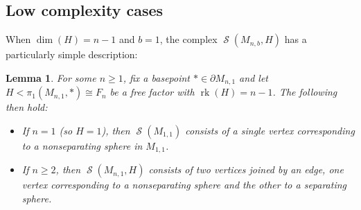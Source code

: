 \documentclass[11pt]{amsart}
\numberwithin{equation}{section}
\theoremstyle{plain}
\newtheorem{lemma}[theorem]{Lemma}
\theoremstyle{definition}
\theoremstyle{remark}
\DeclareMathOperator{\rank}{rk}
\DeclareMathOperator{\Spheres}{\mathcal{S}}
\begin{document}
\subsection{Low complexity cases}
When $\dim(H) = n-1$ and $b=1$, the complex $\Spheres(M_{n,b},H)$ has a particularly simple description:

\begin{lemma}
\label{lemma:changeofcoordinates}
For some $n \geq 1$, fix a basepoint $\ast \in \partial M_{n,1}$
and let $H < \pi_1(M_{n,1},\ast) \cong F_n$ be a free factor with $\rank(H) = n-1$.
The following then hold:
\begin{itemize}
\item If $n=1$ (so $H = 1$), then $\Spheres(M_{1,1})$ consists of a single vertex corresponding
to a nonseparating sphere in $M_{1,1}$.
\item If $n \geq 2$, then $\Spheres(M_{n,1},H)$ consists of two vertices joined by an edge, one
vertex corresponding to a nonseparating sphere and the other to a separating sphere.
\end{itemize}
\end{lemma}
\end{document}
